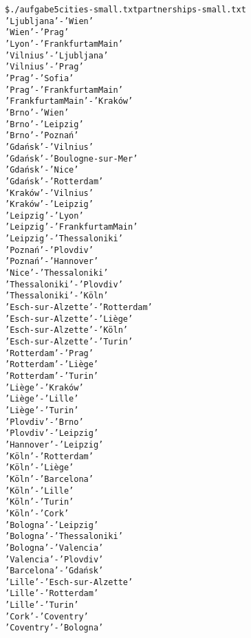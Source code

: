 \documentclass{scrartcl}
\begin{document}
\begin{alltt}
\$ ./aufgabe5 cities-small.txt partnerships-small.txt
'Ljubljana' - 'Wien'
'Wien' - 'Prag'
'Lyon' - 'Frankfurt am Main'
'Vilnius' - 'Ljubljana'
'Vilnius' - 'Prag'
'Prag' - 'Sofia'
'Prag' - 'Frankfurt am Main'
'Frankfurt am Main' - 'Kraków'
'Brno' - 'Wien'
'Brno' - 'Leipzig'
'Brno' - 'Poznań'
'Gdańsk' - 'Vilnius'
'Gdańsk' - 'Boulogne-sur-Mer'
'Gdańsk' - 'Nice'
'Gdańsk' - 'Rotterdam'
'Kraków' - 'Vilnius'
'Kraków' - 'Leipzig'
'Leipzig' - 'Lyon'
'Leipzig' - 'Frankfurt am Main'
'Leipzig' - 'Thessaloniki'
'Poznań' - 'Plovdiv'
'Poznań' - 'Hannover'
'Nice' - 'Thessaloniki'
'Thessaloniki' - 'Plovdiv'
'Thessaloniki' - 'Köln'
'Esch-sur-Alzette' - 'Rotterdam'
'Esch-sur-Alzette' - 'Liège'
'Esch-sur-Alzette' - 'Köln'
'Esch-sur-Alzette' - 'Turin'
'Rotterdam' - 'Prag'
'Rotterdam' - 'Liège'
'Rotterdam' - 'Turin'
'Liège' - 'Kraków'
'Liège' - 'Lille'
'Liège' - 'Turin'
'Plovdiv' - 'Brno'
'Plovdiv' - 'Leipzig'
'Hannover' - 'Leipzig'
'Köln' - 'Rotterdam'
'Köln' - 'Liège'
'Köln' - 'Barcelona'
'Köln' - 'Lille'
'Köln' - 'Turin'
'Köln' - 'Cork'
'Bologna' - 'Leipzig'
'Bologna' - 'Thessaloniki'
'Bologna' - 'Valencia'
'Valencia' - 'Plovdiv'
'Barcelona' - 'Gdańsk'
'Lille' - 'Esch-sur-Alzette'
'Lille' - 'Rotterdam'
'Lille' - 'Turin'
'Cork' - 'Coventry'
'Coventry' - 'Bologna'
\end{alltt}
\end{document}
